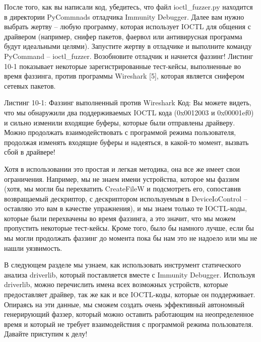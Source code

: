 \documentclass[12pt]{book}
\begin{document}
После того, как вы написали код, убедитесь, что файл ioctl\_fuzzer.py находится в директории PyCommnads отладчика Immunity Debugger. Далее вам нужно выбрать жертву – любую программу, которая использует IOCTL для общения с драйвером (например, снифер пакетов, фаервол или антивирусная программа будут идеальными целями). Запустите жертву в отладчике и выполните команду PyCommand – ioctl\_fuzzer. Возобновите отладчик и начнется фаззинг! Листинг 10-1 показывает некоторые зарегистрированные тест-кейсы, выполненные во время фаззинга, против программы Wireshark [5], которая является снифером сетевых пакетов. 

Листинг 10-1: Фаззинг выполненный против Wireshark
Код:
Вы можете видеть, что мы обнаружили два поддерживаемых IOCTL кода (0x0012003 и 0x00001ef0) и сильно изменили входящие буферы, которые были отправлены драйверу. Можно продолжать взаимодействовать с программой режима пользователя, продолжая изменять входящие буферы и надеяться, в какой-то момент, вызвать сбой в драйвере! 

Хотя в использовании это простая и легкая методика, она все же имеет свои ограничения. Например, мы не знаем имени устройства, которое мы фаззим (хотя, мы могли бы перехватить CreateFileW и подсмотреть его, сопоставив возвращаемый дескриптор, с дескриптором используемым в DeviceIoControl – оставляю это вам в качестве упражнения), и мы знаем только те IOCTL-коды, которые были перехвачены во время фаззинга, а это значит, что мы можем пропустить некоторые тест-кейсы. Кроме того, было бы намного лучше, если бы мы могли продолжать фаззинг до момента пока бы нам это не надоело или мы не нашли уязвимость. 

В следующем разделе мы узнаем, как использовать инструмент статического анализа driverlib, который поставляется вместе с Immunity Debugger. Используя driverlib, можно перечислить имена всех возможных устройств, которые предоставляет драйвер, так же как и все IOCTL-коды, которые он поддерживает. Опираясь на эти данные, мы сможем создать очень эффективный автономный генерирующий фаззер, который можно оставить работающим на неопределенное время и который не требует взаимодействия с программой режима пользователя. Давайте приступим к делу!
\end{document}
